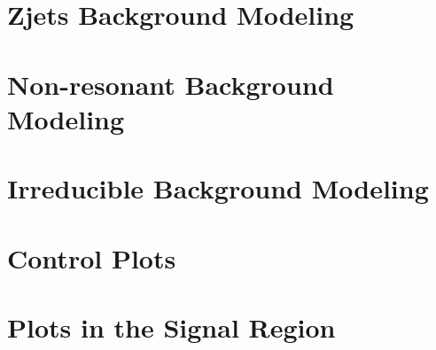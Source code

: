 \vspace{0.3cm}



\section{Zjets Background Modeling}\label{sec:dybk}

\section{Non-resonant Background Modeling}

\section{Irreducible Background Modeling}

\section{Control Plots}

\section{Plots in the Signal Region}
